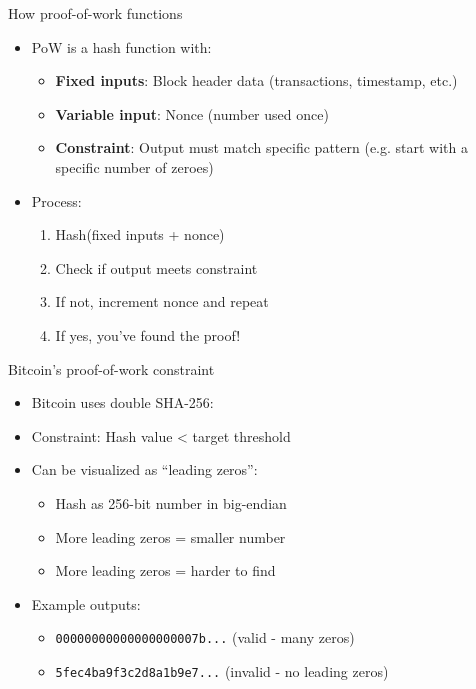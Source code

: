 \documentclass[aspectratio=169, lualatex, handout]{beamer}
\begin{document}
\begin{frame}{How proof-of-work functions}
	\begin{itemize}
		\item PoW is a hash function with:
		      \begin{itemize}
			      \item \textbf{Fixed inputs}: Block header data (transactions, timestamp, etc.)
			      \item \textbf{Variable input}: Nonce (number used once)
			      \item \textbf{Constraint}: Output must match specific pattern (e.g. start with a specific number of zeroes)
		      \end{itemize}
		\item Process:
		      \begin{enumerate}
			      \item Hash(fixed inputs + nonce)
			      \item Check if output meets constraint
			      \item If not, increment nonce and repeat
			      \item If yes, you've found the proof!
		      \end{enumerate}
	\end{itemize}
\end{frame}

\begin{frame}{Bitcoin's proof-of-work constraint}
	\begin{itemize}
		\item Bitcoin uses double SHA-256: 
		\item Constraint: Hash value < target threshold
		\item Can be visualized as ``leading zeros'':
		      \begin{itemize}
			      \item Hash as 256-bit number in big-endian
			      \item More leading zeros = smaller number
			      \item More leading zeros = harder to find
		      \end{itemize}
		\item Example outputs:
		      \begin{itemize}
			      \item \texttt{00000000000000000007b...} (valid - many zeros)
			      \item \texttt{5fec4ba9f3c2d8a1b9e7...} (invalid - no leading zeros)
		      \end{itemize}
	\end{itemize}
\end{frame}
\end{document}
